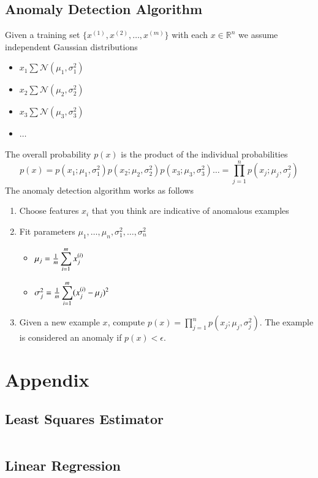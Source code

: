 \documentclass[a4paper,twoside,10pt]{article}
\begin{document}
\subsection{Anomaly Detection Algorithm}
Given a training set $\{x^{(1)},x^{(2)},\ldots,x^{(m)}\}$ with each $x\in\mathbb{R}^n$
we assume independent Gaussian distributions
\begin{itemize}
\item $x_1\sum\mathcal{N}(\mu_1,\sigma^2_1)$
\item $x_2\sum\mathcal{N}(\mu_2,\sigma^2_2)$
\item $x_3\sum\mathcal{N}(\mu_3,\sigma^2_3)$
\item $\ldots$
\end{itemize}
The overall probability $p(x)$ is the product of the individual probabilities
\begin{equation*}
  p(x)=p(x_1;\mu_1,\sigma_1^2) p(x_2;\mu_2,\sigma_2^2) p(x_3;\mu_3,\sigma_3^2) \ldots=
  \prod_{j=1}^n p(x_j;\mu_j,\sigma_j^2)
\end{equation*}
The anomaly detection algorithm works as follows
\begin{enumerate}
  \item Choose features $x_i$ that you think are indicative of anomalous examples
  \item Fit parameters $\mu_1,\ldots,\mu_n,\sigma_1^2,\ldots,\sigma_n^2$
    \begin{itemize}
    \item $\mu_j=\frac{1}{m}\displaystyle\sum_{i=1}^mx^{(i)}_j$
    \item $\sigma_j^2=\frac{1}{m}\displaystyle\sum_{i=1}^m(x^{(i)}_j-\mu_j)^2$
    \end{itemize}
  \item Given a new example $x$, compute $p(x)=\prod_{j=1}^n p(x_j;\mu_j,\sigma_j^2)$. The example is considered an anomaly if $p(x)<\epsilon$.
\end{enumerate}

\clearpage

\appendix
\section{Appendix}
\subsection{Least Squares Estimator}\label{app:lse}
\inputminted[frame=lines,linenos,fontsize=\small]{python}{least_squares.py}

\subsection{Linear Regression}\label{app:gradientdescent}
\inputminted[frame=lines,linenos,fontsize=\small]{python}{gradient_descent.py}
\end{document}
